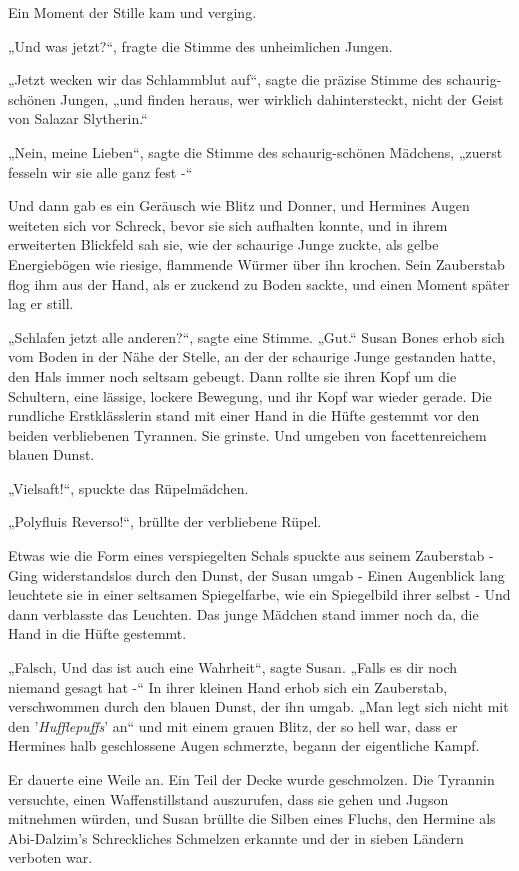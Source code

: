 {Ein Moment der Stille kam und verging.

„Und was jetzt?“, fragte die Stimme des unheimlichen Jungen.

„Jetzt wecken wir das Schlammblut auf“, sagte die präzise Stimme des schaurig-schönen Jungen, „und finden heraus, wer wirklich dahintersteckt, nicht der Geist von Salazar Slytherin.“

„Nein, meine Lieben“, sagte die Stimme des schaurig-schönen Mädchens, „zuerst fesseln wir sie alle ganz fest -“

Und dann gab es ein Geräusch wie Blitz und Donner, und Hermines Augen weiteten sich vor Schreck, bevor sie sich aufhalten konnte, und in ihrem erweiterten Blickfeld sah sie, wie der schaurige Junge zuckte, als gelbe Energiebögen wie riesige, flammende Würmer über ihn krochen. Sein Zauberstab flog ihm aus der Hand, als er zuckend zu Boden sackte, und einen Moment später lag er still.

„Schlafen jetzt alle anderen?“, sagte eine Stimme. „Gut.“ Susan Bones erhob sich vom Boden in der Nähe der Stelle, an der der schaurige Junge gestanden hatte, den Hals immer noch seltsam gebeugt. Dann rollte sie ihren Kopf um die Schultern, eine lässige, lockere Bewegung, und ihr Kopf war wieder gerade. Die rundliche Erstklässlerin stand mit einer Hand in die Hüfte gestemmt vor den beiden verbliebenen Tyrannen. Sie grinste. Und umgeben von facettenreichem blauen Dunst.

„Vielsaft!“, spuckte das Rüpelmädchen.

„Polyfluis Reverso!“, brüllte der verbliebene Rüpel.

Etwas wie die Form eines verspiegelten Schals spuckte aus seinem Zauberstab - Ging widerstandslos durch den Dunst, der Susan umgab - Einen Augenblick lang leuchtete sie in einer seltsamen Spiegelfarbe, wie ein Spiegelbild ihrer selbst - Und dann verblasste das Leuchten. Das junge Mädchen stand immer noch da, die Hand in die Hüfte gestemmt.

„Falsch, Und das ist auch eine Wahrheit“, sagte Susan. „Falls es dir noch niemand gesagt hat -“ In ihrer kleinen Hand erhob sich ein Zauberstab, verschwommen durch den blauen Dunst, der ihn umgab. „Man legt sich nicht mit den '\emph{Hufflepuffs}' an“ und mit einem grauen Blitz, der so hell war, dass er Hermines halb geschlossene Augen schmerzte, begann der eigentliche Kampf.

Er dauerte eine Weile an. Ein Teil der Decke wurde geschmolzen. Die Tyrannin versuchte, einen Waffenstillstand auszurufen, dass sie gehen und Jugson mitnehmen würden, und Susan brüllte die Silben eines Fluchs, den Hermine als Abi-Dalzim's Schreckliches Schmelzen erkannte und der in sieben Ländern verboten war.

}
